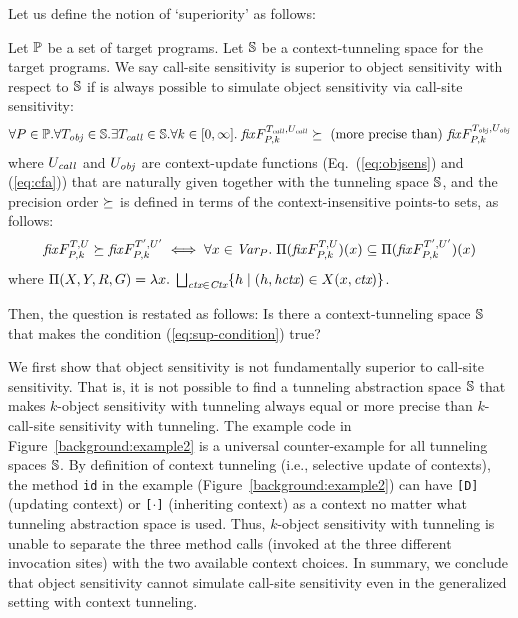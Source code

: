 Let us define the notion of `superiority' as follows: 
\begin{definition}
Let $\mathbb{P}$ be a set of target programs. Let $\mathbb{S}$ be a context-tunneling space for the target programs. 
We say call-site sensitivity is superior to object sensitivity with respect to $\mathbb{S}$ if 
is always possible to simulate object sensitivity via call-site sensitivity: 
\begin{equation}\label{eq:sup-condition}
\forall P \in \mathbb{P}. \forall T_{\it obj} \in \mathbb{S}.  \exists T_{\it call} \in \mathbb{S}.\forall k \in [0,\infty]. 
\; 
{\it fix} F^{T_{\it call}, U_{\it call}}_{P, k} \succeq~\mbox{(more precise than)}~
{\it fix} F^{T_{\it obj}, U_{\it obj}}_{P, k}
\end{equation}
where $U_{\it call}$ and $U_{\it obj}$ are context-update functions (Eq.~(\ref{eq:objsens}) and (\ref{eq:cfa})) that are naturally given together with the tunneling space $\mathbb{S}$, and the precision order $\succeq$ is defined in terms of the context-insensitive points-to sets, as follows: 
 \[
   {\it fix} F_{P,k}^{T, U} \succeq {\it fix}
   F_{P,k}^{T', U'} \iff \forall x\in \text{\it Var}_P.\; \Pi({\it fix}
   F_{P,k}^{T, U})(x) \subseteq \Pi({\it fix}
   F_{P,k}^{T', U'}) (x)
 \]
where $\Pi(X, Y, R,G) = \lambda x.\; \bigsqcup_{\text{\it ctx} \in \text{\it Ctx}}
 \{ h \mid (h, \text{\it hctx}) \in X(x, \text{\it ctx}) \}$.
\end{definition}
Then, the question is restated as follows: Is there a context-tunneling space $\mathbb{S}$ that makes the condition (\ref{eq:sup-condition}) true? 





We first show that object sensitivity is not fundamentally superior to call-site sensitivity. 
That is, it is not possible to find a tunneling
abstraction space $\mathbb{S}$ that makes $k$-object sensitivity with
tunneling always equal or more precise than $k$-call-site
sensitivity with tunneling. The example code in
Figure~\ref{background:example2} is a universal counter-example for all 
tunneling spaces $\mathbb{S}$. By definition of context tunneling
(i.e., selective update of contexts), the method
{\tt id} in the example (Figure~\ref{background:example2}) can have
 \texttt{[D]} (updating context) or \texttt{[$\cdot$]}
(inheriting context) as a context no matter what tunneling abstraction space is
used. Thus, $k$-object sensitivity with tunneling is unable to separate the
three method calls (invoked at the three different invocation sites)
with the two 
available context choices. In summary, we conclude that object sensitivity cannot simulate call-site sensitivity even in the generalized setting with context tunneling. 

